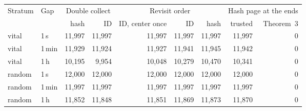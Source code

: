 \begin{tabular}{@{}llrrrrrrr@{}}
\toprule
Stratum & Gap & \multicolumn{2}{c}{Double collect} & \multicolumn{3}{c}{Revisit order} & \multicolumn{2}{c}{Hash page at the ends} \\ \cmidrule(lr){3-4}\cmidrule(lr){5-7}\cmidrule(l){8-9}
 & & hash & ID & ID, center once & ID & hash & trusted & Theorem~3 \\
\midrule
vital & 1\,s & 11,997 & 11,997 & 11,997 & 11,997 & 11,997 & 11,997 & 0 \\
vital & 1\,min & 11,929 & 11,924 & 11,927 & 11,941 & 11,945 & 11,942 & 0 \\
vital & 1\,h & 10,195 & 9,954 & 10,048 & 10,279 & 10,470 & 10,341 & 0 \\
random & 1\,s & 12,000 & 12,000 & 12,000 & 12,000 & 12,000 & 12,000 & 0 \\
random & 1\,min & 11,997 & 11,997 & 11,997 & 11,997 & 11,997 & 11,997 & 0 \\
random & 1\,h & 11,852 & 11,848 & 11,851 & 11,869 & 11,873 & 11,870 & 0 \\
\bottomrule
\end{tabular}
